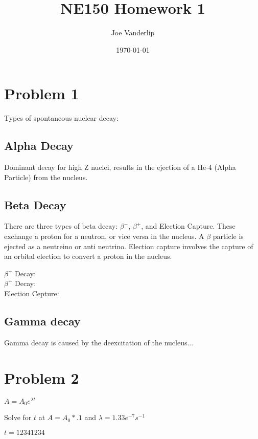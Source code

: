 \documentclass[letter]{article}
\title{NE150 Homework 1}
\author{Joe Vanderlip}
\date{\today}
\begin{document}
\maketitle

\section{Problem 1}

Types of spontaneous nuclear decay:
\subsection{Alpha Decay} 
Dominant decay for high Z nuclei, results in the ejection of a He-4 (Alpha Particle) from the nucleus. 
\begin{center}
\end{center}

\subsection{Beta Decay} 
There are three types of beta decay: $\beta^-$, $\beta^+$, and Election Capture. These exchange a proton for a neutron, or vice versa in the nucleus. A $\beta$ particle is ejected as a neutreino or anti neutrino.  Election capture involves the capture of an orbital election to convert a proton in the nucleus. 
\begin{center}
$\beta^-$ Decay: \\

$\beta^+$ Decay: \\

Election Cepture: 
\end{center}
  
\subsection{Gamma decay} 

Gamma decay is caused by the deexcitation of the nucleus... 

\begin{center}
\end{center}

\section{Problem 2}
\begin{center}
$A=A_{0}e^{\lambda t}$
\end{center}
Solve for $t$ at $A=A_{0}*.1 $ and $\lambda=1.33e^{-7} s^{-1}$
\begin{center}
$t= 12341234$
\end{center}
\end{document}
